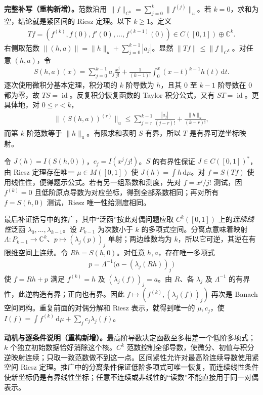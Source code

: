 \documentclass[../../main.tex]{subfiles}
\begin{document}
\begin{solution}
\textbf{完整补写（重构新增）。}范数沿用 $\|f\|_{C^k}=\sum_{j=0}^k\|f^{(j)}\|_u$。若 $k=0$，求和为空，结论就是紧区间的 Riesz 定理。以下 $k\geqslant1$。定义
\begin{align*}
Tf=(f^{(k)},f(0),f'(0),\ldots,f^{(k-1)}(0))
\in C([0,1])\oplus\mathbb C^k.
\end{align*}
右侧取范数 $\|(h,a)\|=\|h\|_u+\sum_{j=0}^{k-1}|a_j|$。显然 $\|Tf\|\leqslant\|f\|_{C^k}$。对任意 $(h,a)$，令
\begin{align*}
S(h,a)(x)=\sum_{j=0}^{k-1}a_j\frac{x^j}{j!}
+\frac1{(k-1)!}\int_0^x(x-t)^{k-1}h(t)\,\mathrm dt.
\end{align*}
逐次使用微积分基本定理，积分项的 $k$ 阶导数为 $h$，且其 $0$ 至 $k-1$ 阶导数在 $0$ 都为零，故 $TS=\operatorname{id}$。反复积分恢复函数的 Taylor 积分公式，又有 $ST=\operatorname{id}$。更具体地，对 $0\leqslant r<k$，
\begin{align*}
\|(S(h,a))^{(r)}\|_u
\leqslant\sum_{j=r}^{k-1}\frac{|a_j|}{(j-r)!}+\frac{\|h\|_u}{(k-r)!},
\end{align*}
而第 $k$ 阶范数等于 $\|h\|_u$。有限求和表明 $S$ 有界，所以 $T$ 是有界可逆坐标映射。

令 $J(h)=I(S(h,0))$，$c_j=I(x^j/j!)$。$S$ 的有界性保证 $J\in C([0,1])^*$，由 Riesz 定理存在唯一 $\mu\in M([0,1])$ 使 $J(h)=\int h\,\mathrm d\mu$。对 $f=S(Tf)$ 使用线性性，便得题示公式。若有另一组系数和测度，先对 $f=x^j/j!$ 测试，因 $f^{(k)}=0$ 且低阶原点导数为对应坐标，得到全部系数相同；再对所有 $f=S(h,0)$ 测试，Riesz 唯一性给测度相同。

最后补证括号中的推广，其中“泛函”按此对偶问题应取 $C^k([0,1])$ 上的\emph{连续线性}泛函 $\lambda_0,\ldots,\lambda_{k-1}$。设 $P_{k-1}$ 为次数小于 $k$ 的多项式空间。分离点意味着映射 $\Lambda:P_{k-1}\to\mathbb C^k$、$p\mapsto(\lambda_j(p))_j$ 单射；两边维数均为 $k$，所以它可逆，其逆在有限维空间上连续。令 $Rh=S(h,0)$。对任意 $h,a$，存在唯一多项式
\begin{align*}
p=\Lambda^{-1}\bigl(a-(\lambda_j(Rh))_j\bigr)
\end{align*}
使 $f=Rh+p$ 满足 $f^{(k)}=h$ 及 $(\lambda_j(f))_j=a$。由 $R$、各 $\lambda_j$ 及 $\Lambda^{-1}$ 的有界性，此逆构造有界；正向也有界。因此 $f\mapsto(f^{(k)},(\lambda_j(f))_j)$ 再次是 Banach 空间同构。重复前面的对偶分解和 Riesz 表示，就得到唯一的 $\mu,c_j$，使 $I(f)=\int f^{(k)}\,\mathrm d\mu+\sum_jc_j\lambda_j(f)$。
\end{solution}
\begin{remark}
\textbf{动机与逐条件说明（重构新增）。}最高阶导数决定函数至多相差一个低阶多项式；$k$ 个独立初始数据恰好消除这个核。$C^k$ 范数控制全部导数，使微分、初值与积分逆映射连续；只取一致范数做不到这一点。区间紧性允许对最高阶连续导数使用紧空间 Riesz 定理。推广中的分离条件保证低阶多项式可唯一恢复，而连续线性条件使新坐标仍是有界线性坐标；任意不连续或非线性的“读数”不能直接用于同一对偶表示。
\end{remark}
\end{document}
